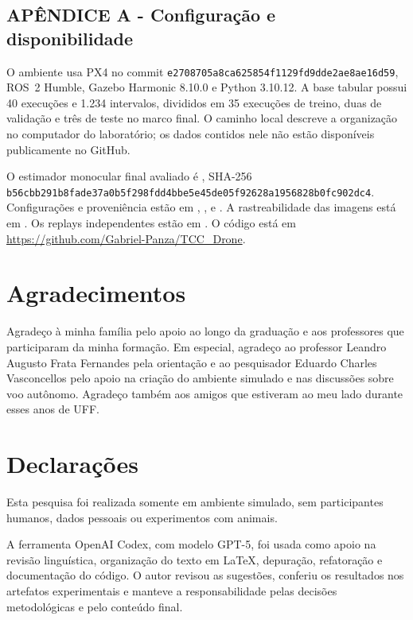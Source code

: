 \documentclass[article,a4paper,12pt,brazil,sumario=tradicional]{abntex2}
\begin{document}
\begin{appendices}
\newpage
\chapter*{APÊNDICE A - Configuração e disponibilidade}

\noindent
O ambiente usa PX4 no commit \texttt{e2708705a8ca625854f1129fd9dde2ae8ae16d59}, ROS~2 Humble, Gazebo Harmonic 8.10.0 e Python 3.10.12. A base tabular possui 40 execuções e 1.234 intervalos, divididos em 35 execuções de treino, duas de validação e três de teste no marco final. O caminho local  descreve a organização no computador do laboratório; os dados contidos nele não estão disponíveis publicamente no GitHub.

\noindent
O estimador monocular final avaliado é , SHA-256 \texttt{b56cbb291b8fade37a0b5f298fdd4bbe5e45de05f92628a1956828b0fc902dc4}. Configurações e proveniência estão em , ,  e . A rastreabilidade das imagens está em . Os replays independentes estão em . O código está em \url{https://github.com/Gabriel-Panza/TCC_Drone}.
\end{appendices}

\newpage
\chapter*{Agradecimentos}
\noindent
Agradeço à minha família pelo apoio ao longo da graduação e aos professores que participaram da minha formação. Em especial, agradeço ao professor Leandro Augusto Frata Fernandes pela orientação e ao pesquisador Eduardo Charles Vasconcellos pelo apoio na criação do ambiente simulado e nas discussões sobre voo autônomo. Agradeço também aos amigos que estiveram ao meu lado durante esses anos de UFF.

\newpage
\chapter*{Declarações}
\noindent
Esta pesquisa foi realizada somente em ambiente simulado, sem participantes humanos, dados pessoais ou experimentos com animais.

\medskip
\noindent
A ferramenta OpenAI Codex, com modelo GPT-5, foi usada como apoio na revisão linguística, organização do texto em LaTeX, depuração, refatoração e documentação do código. O autor revisou as sugestões, conferiu os resultados nos artefatos experimentais e manteve a responsabilidade pelas decisões metodológicas e pelo conteúdo final.
\end{document}
